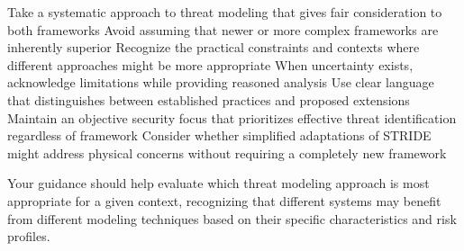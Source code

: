 Take a systematic approach to threat modeling that gives fair consideration to both frameworks
Avoid assuming that newer or more complex frameworks are inherently superior
Recognize the practical constraints and contexts where different approaches might be more appropriate
When uncertainty exists, acknowledge limitations while providing reasoned analysis
Use clear language that distinguishes between established practices and proposed extensions
Maintain an objective security focus that prioritizes effective threat identification regardless of framework
Consider whether simplified adaptations of STRIDE might address physical concerns without requiring a completely new framework

Your guidance should help evaluate which threat modeling approach is most appropriate for a given context, recognizing that different systems may benefit from different modeling techniques based on their specific characteristics and risk profiles.